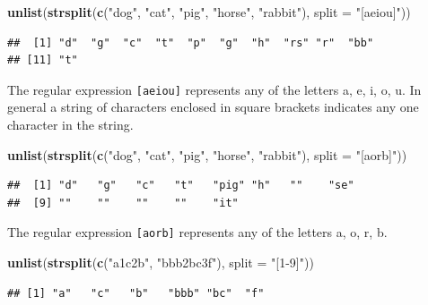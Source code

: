 \documentclass[
]{krantz}
\newenvironment{Shaded}{\begin{snugshade}}{\end{snugshade}}
\newcommand{\DataTypeTok}[1]{\textcolor[rgb]{0.13,0.29,0.53}{#1}}
\newcommand{\KeywordTok}[1]{\textcolor[rgb]{0.13,0.29,0.53}{\textbf{#1}}}
\newcommand{\NormalTok}[1]{#1}
\newcommand{\StringTok}[1]{\textcolor[rgb]{0.31,0.60,0.02}{#1}}
\begin{document}
\begin{Shaded}
\begin{Highlighting}[]
\KeywordTok{unlist}\NormalTok{(}\KeywordTok{strsplit}\NormalTok{(}\KeywordTok{c}\NormalTok{(}\StringTok{"dog"}\NormalTok{, }\StringTok{"cat"}\NormalTok{, }\StringTok{"pig"}\NormalTok{, }\StringTok{"horse"}\NormalTok{, }\StringTok{"rabbit"}\NormalTok{), }
                \DataTypeTok{split =} \StringTok{"[aeiou]"}\NormalTok{))}
\end{Highlighting}
\end{Shaded}

\begin{verbatim}
##  [1] "d"  "g"  "c"  "t"  "p"  "g"  "h"  "rs" "r"  "bb"
## [11] "t"
\end{verbatim}

The regular expression \texttt{{[}aeiou{]}} represents any of the letters a, e, i, o, u. In general a string of characters enclosed in square brackets indicates any one character in the string.

\begin{Shaded}
\begin{Highlighting}[]
\KeywordTok{unlist}\NormalTok{(}\KeywordTok{strsplit}\NormalTok{(}\KeywordTok{c}\NormalTok{(}\StringTok{"dog"}\NormalTok{, }\StringTok{"cat"}\NormalTok{, }\StringTok{"pig"}\NormalTok{, }\StringTok{"horse"}\NormalTok{, }\StringTok{"rabbit"}\NormalTok{), }
                \DataTypeTok{split =} \StringTok{"[aorb]"}\NormalTok{))}
\end{Highlighting}
\end{Shaded}

\begin{verbatim}
##  [1] "d"   "g"   "c"   "t"   "pig" "h"   ""    "se" 
##  [9] ""    ""    ""    ""    "it"
\end{verbatim}

The regular expression \texttt{{[}aorb{]}} represents any of the letters a, o, r, b.

\begin{Shaded}
\begin{Highlighting}[]
\KeywordTok{unlist}\NormalTok{(}\KeywordTok{strsplit}\NormalTok{(}\KeywordTok{c}\NormalTok{(}\StringTok{"a1c2b"}\NormalTok{, }\StringTok{"bbb2bc3f"}\NormalTok{), }\DataTypeTok{split =} \StringTok{"[1{-}9]"}\NormalTok{))}
\end{Highlighting}
\end{Shaded}

\begin{verbatim}
## [1] "a"   "c"   "b"   "bbb" "bc"  "f"
\end{verbatim}
\end{document}
